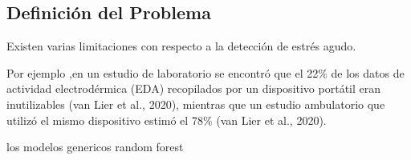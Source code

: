 \subsection{Definición del Problema}




 

 
Existen varias  limitaciones con respecto a la detección de  estrés agudo. 


Por ejemplo ,en un estudio de laboratorio se  encontró que el 22\% de 
los datos de actividad electrodérmica (EDA) recopilados por un dispositivo 
portátil eran inutilizables (van Lier et al., 2020), mientras que un estudio 
ambulatorio que utilizó el mismo dispositivo estimó el 78\% (van 
Lier et al., 2020). 

los modelos genericos random forest 

